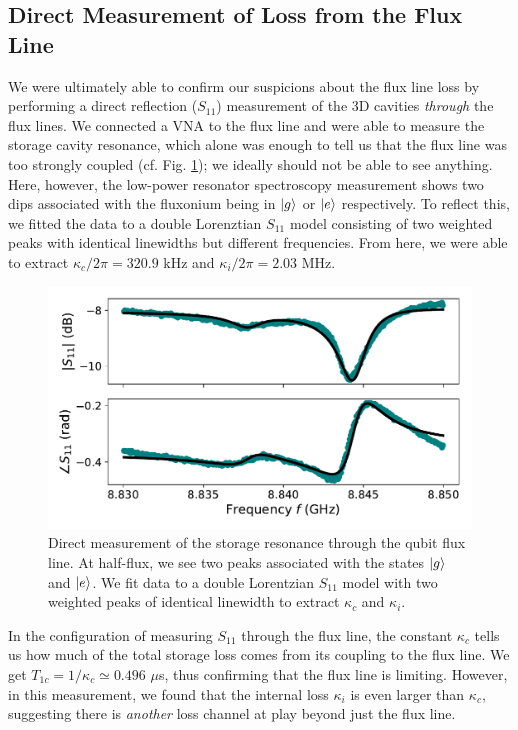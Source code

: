 \subsection{Direct Measurement of Loss from the Flux Line}

We were ultimately able to confirm our suspicions about the flux line loss by performing a direct reflection ($S_{11}$) measurement of the 3D cavities \textit{through} the flux lines. We connected a VNA to the flux line and were able to measure the storage cavity resonance, which alone was enough to tell us that the flux line was too strongly coupled (cf. Fig. \ref{fig:4_storage_loss_thru_flux_line}); we ideally should not be able to see anything. Here, however, the low-power resonator spectroscopy measurement shows two dips associated with the fluxonium being in $\lvert g\rangle$ or $\lvert e\rangle$ respectively. To reflect this, we fitted the data to a double Lorenztian $S_{11}$ model consisting of two weighted peaks with identical linewidths but different frequencies. From here, we were able to extract $\kappa_c/2\pi = 320.9$ kHz and $\kappa_i/2\pi = 2.03$ MHz. 

\begin{figure}[h]
    \centering
    \includegraphics[width=0.7\linewidth]{Figures/4/storage_loss_thru_flux_line.pdf}
    \caption{Direct measurement of the storage resonance through the qubit flux line. At half-flux, we see two peaks associated with the states $\lvert g\rangle$ and $\lvert e\rangle$. We fit data to a double Lorentzian $S_{11}$ model with two weighted peaks of identical linewidth to extract $\kappa_c$ and $\kappa_i$.}
    \label{fig:4_storage_loss_thru_flux_line}
\end{figure}

In the configuration of measuring $S_{11}$ through the flux line, the constant $\kappa_c$ tells us how much of the total storage loss comes from its coupling to the flux line. We get $T_{1c} = 1/\kappa_c \simeq 0.496$ $\mu$s, thus confirming that the flux line is limiting. However, in this measurement, we found that the internal loss $\kappa_i$ is even larger than $\kappa_c$, suggesting there is \textit{another} loss channel at play beyond just the flux line. 

